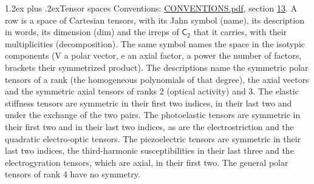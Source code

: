\documentclass[10pt,a4paper]{article}
\makeatletter
\renewcommand\section{\@startsection{section}{1}{\z@}{-3ex plus -1ex minus -.2ex}%
  {1.2ex plus .2ex}{\normalfont\large\sffamily\bfseries\color{parttitle}}}
\numberwithin{equation}{section}
\newcommand{\grp}[1]{\mathsf{#1}}
\makeatother
\begin{document}
\section{Tensor spaces}\label{s:tensor_spaces}
Conventions: \href{../../CONVENTIONS.pdf}{CONVENTIONS.pdf}, section \href{../../CONVENTIONS.pdf\#conv.13}{13}.
\leavevmode\label{n:head.name}\label{n:head.description}\label{n:head.dim}\label{n:head.decomposition}A row is a space of Cartesian tensors, with its Jahn symbol (name), its description in words, its dimension (dim) and the irreps of $\grp{C_{2}}$ that it carries, with their multiplicities (decomposition). \label{n:label.jahn}The same symbol names the space in the isotypic components (V a polar vector, e an axial factor, a power the number of factors, brackets their symmetrized product). The descriptions name the symmetric polar tensors of a rank (the homogeneous polynomials of that degree), the axial vectors and the symmetric axial tensors of ranks 2 (optical activity) and 3. The elastic stiffness tensors are symmetric in their first two indices, in their last two and under the exchange of the two pairs. The photoelastic tensors are symmetric in their first two and in their last two indices, as are the electrostriction and the quadratic electro-optic tensors. The piezoelectric tensors are symmetric in their last two indices, the third-harmonic susceptibilities in their last three and the electrogyration tensors, which are axial, in their first two. The general polar tensors of rank 4 have no symmetry.
\end{document}
